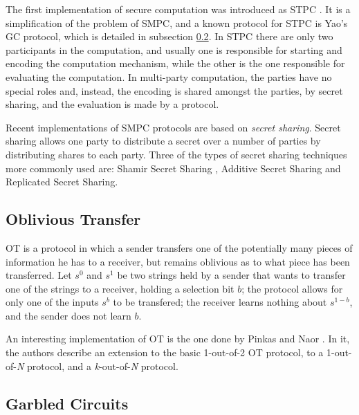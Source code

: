 The first implementation of secure computation was introduced as \ac{STPC} \cite{yao1982protocols}. It is a simplification of the problem of \ac{SMPC}, and a known protocol for \ac{STPC} is Yao's \ac{GC} protocol, which is detailed in subsection \ref{ssec:GarbledCircuits}. In \ac{STPC} there are only two participants in the computation, and usually one is responsible for starting and encoding the computation mechanism, while the other is the one responsible for evaluating the computation. In multi-party computation, the parties have no special roles and, instead, the encoding is shared amongst the parties, by secret sharing, and the evaluation is made by a protocol. 

Recent implementations of \ac{SMPC} protocols are based on \textit{secret sharing}. Secret sharing allows one party to distribute a secret over a number of parties by distributing shares to each party. Three of the types of secret sharing techniques more commonly used are: Shamir Secret Sharing \cite{shamir1979share}, Additive Secret Sharing and Replicated Secret Sharing.






\subsection{Oblivious Transfer}
\label{ssec:ObliviousTransfer}


\acf{OT} \cite{rabin2005exchange} is a protocol in which a sender transfers one of the potentially many pieces of information he has to a receiver, but remains oblivious as to what piece has been transferred. Let $s^0$ and $s^1$ be two strings held by a sender that wants to transfer one of the strings to a receiver, holding a selection bit $b$; the protocol allows for only one of the inputs $s^b$ to be transfered; the receiver learns nothing about $s^{1-b}$, and the sender does not learn $b$. 

An interesting implementation of \ac{OT} is the one done by Pinkas and Naor \cite{naor2005computationally}. In it, the authors describe an extension to the basic 1-out-of-2 \ac{OT} protocol, to a 1-out-of-\textit{N} protocol, and a \textit{k}-out-of-\textit{N} protocol.


\subsection{Garbled Circuits} 
\label{ssec:GarbledCircuits}



